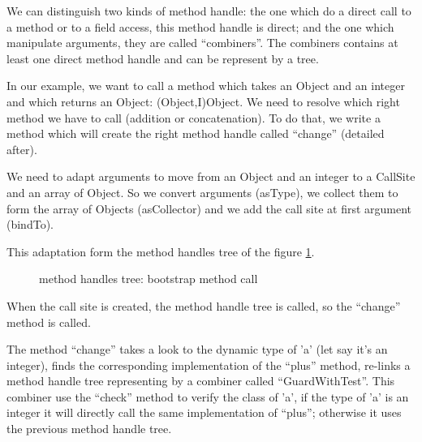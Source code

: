 \documentclass{sig-alternate}
\begin{document}

      We can distinguish two kinds of method handle:
      the one which do a direct call to a method or to a field access, this method handle is direct;
      and the one which manipulate arguments, they are called ``combiners''.
      The combiners contains at least one direct method handle and can be represent by a tree.

      In our example, we want to call a method which takes an Object and an integer and which returns an Object: (Object,I)Object.
      We need to resolve which right method we have to call (addition or concatenation).
      To do that, we write a method which will create the right method handle called ``change'' (detailed after).

      We need to adapt arguments to move from an Object and an integer to a CallSite and an array of Object.
      So we convert arguments (asType), we collect them to form the array of Objects (asCollector) and we add the call site at first argument (bindTo).

      

      This adaptation form the method handles tree of the figure \ref{ast1}.

      \begin{figure}[!h]
        \centering \resizebox{.6\linewidth}{!}{}
        \caption{method handles tree: bootstrap method call}
        \label{ast1}
      \end{figure}

      When the call site is created, the method handle tree is called, so the ``change'' method is called.

      

      The method ``change'' takes a look to the dynamic type of 'a' (let say it's an integer),
      finds the corresponding implementation of the ``plus'' method,
      re-links a method handle tree representing by a combiner called ``GuardWithTest''.
      This combiner use the ``check'' method to verify the class of 'a',
      if the type of 'a' is an integer it will directly call the same implementation of ``plus'';
      otherwise it uses the previous method handle tree.
\end{document}
